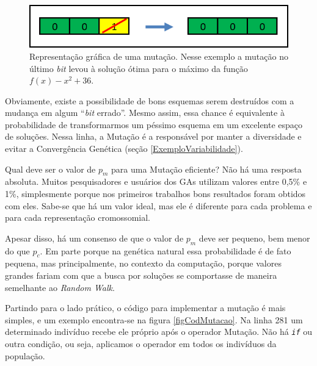 	\begin{figure}[htp]
		\begin{center}
			\includegraphics[width=13cm]{figs/ga/Mutacao.png}
		\end{center}
		\caption{\label{figMutacao}Representação gráfica de uma mutação. Nesse exemplo a mutação no último \textit{bit} levou à solução ótima para o máximo da função $f(x) -x^2 + 36$.}
	\end{figure}
	
	Obviamente, existe a possibilidade de bons esquemas serem destruídos com a mudança em algum ``\textit{bit} errado''. Mesmo assim, essa chance é equivalente à probabilidade de transformarmos um péssimo esquema em um excelente espaço de soluções. Nessa linha, a Mutação é a responsável por manter a diversidade e evitar a Convergência Genética (seção \ref{ExemploVariabilidade}).
	
	Qual deve ser o valor de $p_m$ para uma Mutação eficiente? Não há uma resposta absoluta. Muitos pesquisadores e usuários dos GAs utilizam valores entre 0,5\% e 1\%, simplesmente porque nos primeiros trabalhos bons resultados foram obtidos com eles. Sabe-se que há um valor ideal, mas ele é diferente para cada problema e para cada representação cromossomial.
	
	Apesar disso, há um consenso de que o valor de $p_m$ deve ser pequeno, bem menor do que $p_c$. Em parte porque na genética natural essa probabilidade é de fato pequena, mas principalmente, no contexto da computação, porque valores grandes fariam com que a busca por soluções se comportasse de maneira semelhante ao \textit{Random Walk}.
	
	Partindo para o lado prático, o código para implementar a mutação é mais simples, e um exemplo encontra-se na figura \ref{figCodMutacao}. Na linha 281 um determinado indivíduo recebe ele próprio após o operador Mutação. Não há \textit{\texttt{if}} ou outra condição, ou seja, aplicamos o operador em todos os indivíduos da população.
	
